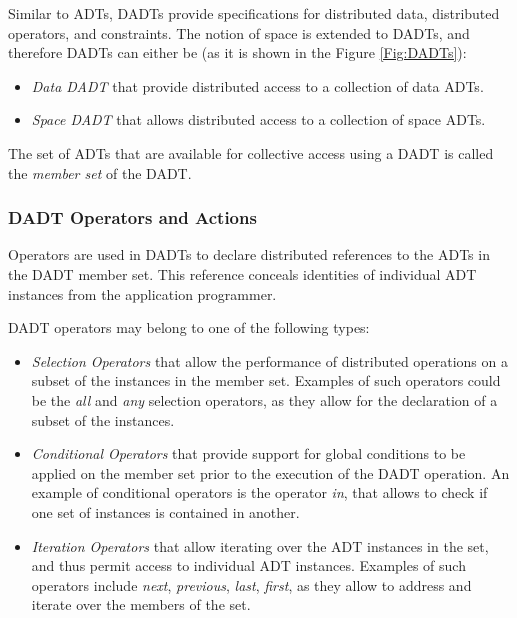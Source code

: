 Similar to ADTs, DADTs 
provide specifications for distributed data, distributed operators, and 
constraints. The notion of space is extended to DADTs, and therefore DADTs can
either be (as it is shown in the Figure \ref{Fig:DADTs}):

\begin{itemize}
  \item \emph{Data DADT} that provide distributed access to a collection of data
  ADTs.
  \item \emph{Space DADT} that allows distributed access to a collection of
  space ADTs. 
\end{itemize}

The set of ADTs that are available for collective access using a DADT is called the \emph{member set} of
the DADT.

\subsubsection{DADT Operators and Actions} \label{subsubsec:OperatorsAndActions}

Operators are used in DADTs to declare distributed references to
the ADTs in the DADT member set. This reference conceals identities of individual ADT
instances from the application programmer. 

DADT operators may belong to one of the following types:

\begin{itemize}
  \item \emph{Selection Operators} that allow the performance of
  distributed operations on a subset of the instances in the member set.
  Examples of such operators could be the \emph{all} and \emph{any} selection
  operators, as they allow for the declaration of a subset of the instances.

  \item \emph{Conditional Operators} that provide support for global
  conditions to be applied on the member set prior to the execution of the DADT
  operation. An example of conditional operators is the operator
  \emph{in}, that allows to check if one set of instances is contained in another.

  \item \emph{Iteration Operators} that allow iterating over the
  ADT instances in the set, and thus permit access to individual ADT instances.
  Examples of such operators include \emph{next}, \emph{previous}, \emph{last},
  \emph{first}, as they allow to address and iterate over the members of the
  set.
\end{itemize}

